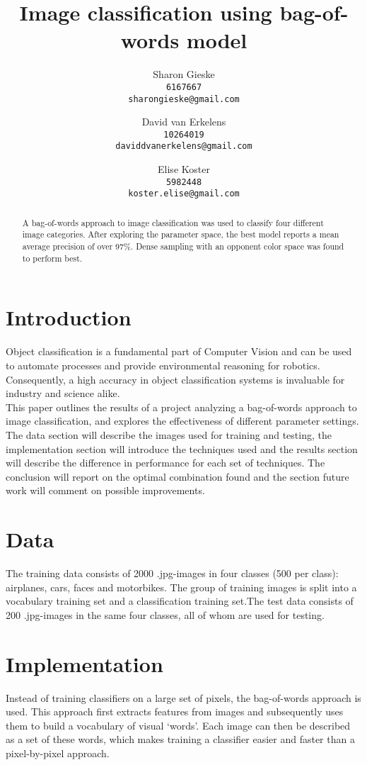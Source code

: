 \documentclass{article} %
\title{Image classification using bag-of-words model}
\author{
Sharon Gieske \\
\texttt{6167667}\\
\texttt{sharongieske@gmail.com} \\
\and
David van Erkelens\\
\texttt{10264019}\\
\texttt{daviddvanerkelens@gmail.com} \\
\and
Elise Koster \\
\texttt{5982448}\\
\texttt{koster.elise@gmail.com}
}
\begin{document}
\maketitle

\begin{abstract}
A bag-of-words approach to image classification was used  to classify four different image categories. After exploring the parameter space, the best model reports a mean average precision of over 97\%. Dense sampling with an opponent color space was found to perform best.
\end{abstract}


\section{Introduction}
Object classification is a fundamental part of Computer Vision and can be used to automate processes and provide environmental reasoning for robotics. Consequently, a high accuracy in object classification systems is invaluable for industry and science alike.\\
This paper outlines the results of a project analyzing a bag-of-words approach to image classification, and explores the effectiveness of different parameter settings.\\
The data section will describe the images used for training and testing, the implementation section will introduce the techniques used and the results section will describe the difference in performance for each set of techniques. The conclusion will report on the optimal combination found and the section future work will comment on possible improvements.

\section{Data}
The training data consists of 2000 .jpg-images in four classes (500 per class): airplanes, cars, faces and motorbikes. The group of training images is split into a vocabulary training set and a classification training set.The test data consists of 200 .jpg-images in the same four classes, all of whom are used for testing.

\section{Implementation}
Instead of training classifiers on a large set of pixels, the bag-of-words approach is used. This approach first extracts features from images and subsequently uses them to build a vocabulary of visual `words'. Each image can then be described as a set of these words, which makes training a classifier easier and faster than a pixel-by-pixel approach. \\
\end{document}
